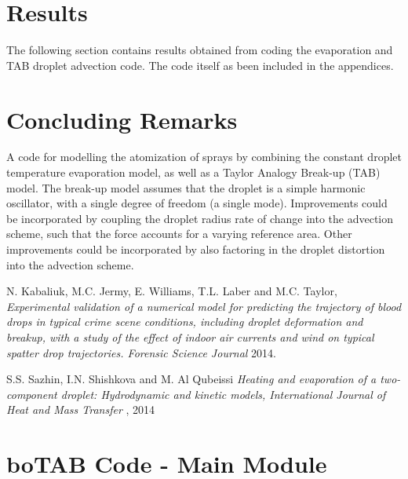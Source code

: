 \documentclass[12pt]{article}
\begin{document}
\section{Results}\label{sec:Results}

The following section contains results obtained from coding the evaporation and TAB droplet advection code. The code itself as been included in the appendices.

\section{Concluding Remarks}\label{sec:ConcludingRemarks}

A code for modelling the atomization of sprays by combining the constant droplet temperature evaporation model, as well as a Taylor Analogy Break-up (TAB) model. The break-up model assumes that the droplet is a simple harmonic oscillator, with a single degree of freedom (a single mode). Improvements could be incorporated by coupling the droplet radius rate of change into the advection scheme, such that the force accounts for a varying reference area. Other improvements could be incorporated by also factoring in the droplet distortion into the advection scheme.

\begin{thebibliography}{1}

 N. Kabaliuk, M.C. Jermy, E. Williams, T.L. Laber and M.C. Taylor, {\em Experimental validation of a numerical model for predicting the trajectory of blood drops in typical crime scene conditions, including droplet deformation and breakup, with a study of the effect of indoor air currents and wind on typical spatter drop trajectories.
  Forensic Science Journal}  2014.

  S.S. Sazhin, I.N. Shishkova and M. Al Qubeissi {\em Heating and evaporation of a two-component droplet: Hydrodynamic and kinetic models, International Journal of Heat and Mass Transfer}
  , 2014

\end{thebibliography}

\newpage
\appendix
\section{boTAB Code - Main Module}
\end{document}
